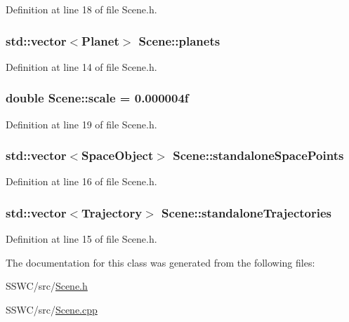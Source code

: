 Definition at line 18 of file Scene.\+h.

\hypertarget{class_scene_a9c898688ba4edd96b93c0cf9b6ce4260}{
\subsubsection[{planets}]{\setlength{\rightskip}{0pt plus 5cm}std\+::vector$<${\bf Planet}$>$ Scene\+::planets\hspace{0.3cm}{\ttfamily [protected]}}}\label{class_scene_a9c898688ba4edd96b93c0cf9b6ce4260}


Definition at line 14 of file Scene.\+h.

\hypertarget{class_scene_a131f85de64b1959b34a2ab49b2e61b7f}{
\subsubsection[{scale}]{\setlength{\rightskip}{0pt plus 5cm}double Scene\+::scale = 0.\+000004f\hspace{0.3cm}{\ttfamily [protected]}}}\label{class_scene_a131f85de64b1959b34a2ab49b2e61b7f}


Definition at line 19 of file Scene.\+h.

\hypertarget{class_scene_ae39b7e0774cc10fc19d6898982ae2a0e}{
\subsubsection[{standalone\+Space\+Points}]{\setlength{\rightskip}{0pt plus 5cm}std\+::vector$<${\bf Space\+Object}$>$ Scene\+::standalone\+Space\+Points\hspace{0.3cm}{\ttfamily [protected]}}}\label{class_scene_ae39b7e0774cc10fc19d6898982ae2a0e}


Definition at line 16 of file Scene.\+h.

\hypertarget{class_scene_a596bcc7043ee58e60705fa050506347c}{
\subsubsection[{standalone\+Trajectories}]{\setlength{\rightskip}{0pt plus 5cm}std\+::vector$<${\bf Trajectory}$>$ Scene\+::standalone\+Trajectories\hspace{0.3cm}{\ttfamily [protected]}}}\label{class_scene_a596bcc7043ee58e60705fa050506347c}


Definition at line 15 of file Scene.\+h.



The documentation for this class was generated from the following files\+:\begin{DoxyCompactItemize}
\item 
S\+S\+W\+C/src/\hyperlink{_scene_8h}{Scene.\+h}\item 
S\+S\+W\+C/src/\hyperlink{_scene_8cpp}{Scene.\+cpp}\end{DoxyCompactItemize}
